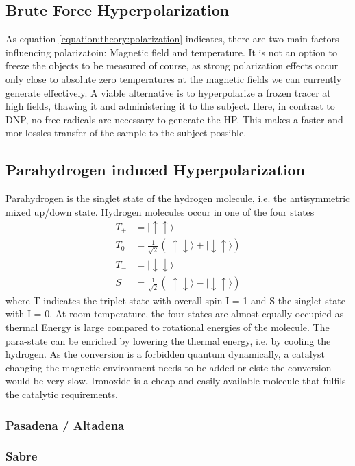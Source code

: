         \subsection{Brute Force Hyperpolarization}
            As equation \ref{equation:theory:polarization} indicates, there are two main factors influencing polarizatoin: Magnetic field and temperature. It is not an option to freeze the objects to be measured of course, as strong polarization effects occur only close to absolute zero temperatures at the magnetic fields we can currently generate effectively. A viable alternative is to hyperpolarize a frozen tracer at high fields, thawing it and administering it to the subject. Here, in contrast to DNP, no free radicals are necessary to generate the HP. This makes a faster and mor lossles transfer of the sample to the subject possible.
        \subsection{Parahydrogen induced Hyperpolarization}
            Parahydrogen is the singlet state of the hydrogen molecule, i.e. the antisymmetric mixed up/down state. Hydrogen molecules occur in one of the four states
            \begin{equation}
            \begin{aligned}
                T_+ &= |\uparrow\uparrow\rangle\\
                T_0 &= \frac{1}{\sqrt{2}}\left(|\uparrow\downarrow\rangle + |\downarrow\uparrow\rangle\right)\\
                T_- &= |\downarrow\downarrow\rangle\\
                S &= \frac{1}{\sqrt{2}}\left(|\uparrow\downarrow\rangle - |\downarrow\uparrow\rangle\right)
            \end{aligned}
        \end{equation}
        where T indicates the triplet state with overall spin I = 1 and S the singlet state with I = 0. At room temperature, the four states are almost equally occupied as thermal Energy is large compared to rotational energies of the molecule. The para-state can be enriched by lowering the thermal energy, i.e. by cooling the hydrogen. As the conversion is a forbidden quantum dynamically, a catalyst changing the magnetic environment needs to be added or elste the conversion would be very slow. Ironoxide is a cheap and easily available molecule that fulfils the catalytic requirements.
        \subsubsection{Pasadena / Altadena}
        \subsubsection{Sabre}
